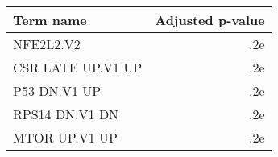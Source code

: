 \begin{tabular}{lr}
\toprule
        Term name &  Adjusted p-value \\
\midrule
        NFE2L2.V2 &               .2e \\
CSR LATE UP.V1 UP &               .2e \\
     P53 DN.V1 UP &               .2e \\
   RPS14 DN.V1 DN &               .2e \\
    MTOR UP.V1 UP &               .2e \\
\bottomrule
\end{tabular}
